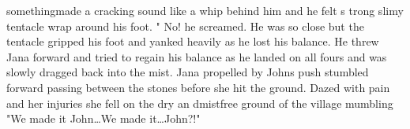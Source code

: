 somethingmade a cracking sound like a whip behind him and he felt s trong slimy tentacle wrap around his foot. " No! he screamed. He was so close but the tentacle gripped his foot and yanked heavily as he lost his balance. He threw Jana forward and tried to regain his balance as he landed on all fours and was slowly dragged back into the mist. Jana propelled by Johns push stumbled forward passing between the stones before she hit the ground. Dazed with pain and her injuries she fell on the dry an dmistfree ground of the village mumbling "We made it John\dots We made it\dots John?!"

